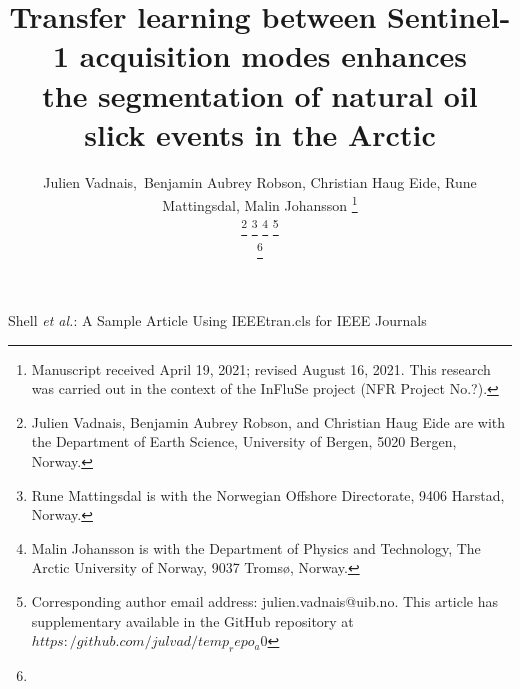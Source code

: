 \documentclass[journal]{IEEEtran}
\begin{document}
\title{Transfer learning between Sentinel-1 acquisition modes enhances \\ the segmentation of natural oil slick events in the Arctic}

\author{Julien Vadnais,~Benjamin Aubrey Robson, Christian Haug Eide, Rune Mattingsdal, Malin Johansson
\thanks{Manuscript received April 19, 2021; revised August 16, 2021. This research was carried out in the context of the InFluSe project (NFR Project No.?).}


\thanks{Julien Vadnais, Benjamin Aubrey Robson, and Christian Haug Eide are with the Department of Earth Science, University of Bergen, 5020 Bergen, Norway.}
\thanks{Rune Mattingsdal is with the Norwegian Offshore Directorate, 9406 Harstad, Norway.}
\thanks{Malin Johansson is with the Department of Physics and Technology, The Arctic University of Norway, 9037 Tromsø, Norway.}
\thanks{Corresponding author email address: julien.vadnais@uib.no. This article has supplementary available in the GitHub repository at $https:/github.com/julvad/temp_repo_a0$}

\thanks{}%
}

%
{Shell \MakeLowercase{\textit{et al.}}: A Sample Article Using IEEEtran.cls for IEEE Journals}


\maketitle
\end{document}
